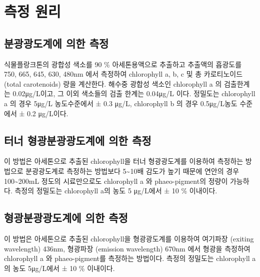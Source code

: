 \documentclass[
]{book}
\begin{document}
\hypertarget{uxce21uxc815-uxc6d0uxb9ac-4}{%
\section{측정 원리}\label{uxce21uxc815-uxc6d0uxb9ac-4}}

\hypertarget{uxbd84uxad11uxad11uxb3c4uxacc4uxc5d0-uxc758uxd55c-uxce21uxc815}{%
\subsection{분광광도계에 의한 측정}\label{uxbd84uxad11uxad11uxb3c4uxacc4uxc5d0-uxc758uxd55c-uxce21uxc815}}

식물플랑크톤의 광합성 색소를 90 \% 아세톤용액으로 추출하고 추출액의 흡광도를 750, 665, 645, 630, 480nm 에서 측정하여 chlorophyll a, b, c 및 총 카로티노이드 (total carotenoids) 량을 계산한다.
해수중 광합성 색소인 chlorophyll a 의 검출한계는 0.02μg/L이고, 그 이외 색소들의 검출 한계는 0.04μg/L 이다.
정밀도는 chlorophyll a 의 경우 5μg/L 농도수준에서 ± 0.3 μg/L, chlorophyll b 의 경우 0.5μg/L농도 수준에서 ± 0.2 μg/L이다.

\hypertarget{uxd130uxb108-uxd615uxad11uxbd84uxad11uxad11uxb3c4uxacc4uxc5d0-uxc758uxd55c-uxce21uxc815}{%
\subsection{터너 형광분광광도계에 의한 측정}\label{uxd130uxb108-uxd615uxad11uxbd84uxad11uxad11uxb3c4uxacc4uxc5d0-uxc758uxd55c-uxce21uxc815}}

이 방법은 아세톤으로 추출된 chlorophyll을 터너 형광광도계를 이용하여 측정하는 방법으로 분광광도계로 측정하는 방법보다 5\textasciitilde10배 감도가 높기 때문에 연안의 경우 100\textasciitilde200mL 정도의 시료만으로도 chlorophyll a 와 phaeo-pigment의 정량이 가능하다. 측정의 정밀도는 chlorophyll a의 농도 5 μg/L에서 ± 10 \% 이내이다.

\hypertarget{uxd615uxad11uxbd84uxad11uxad11uxb3c4uxacc4uxc5d0-uxc758uxd55c-uxce21uxc815}{%
\subsection{형광분광광도계에 의한 측정}\label{uxd615uxad11uxbd84uxad11uxad11uxb3c4uxacc4uxc5d0-uxc758uxd55c-uxce21uxc815}}

이 방법은 아세톤으로 추출된 chlorophyll을 형광광도계를 이용하여 여기파장 (exiting wavelength) 436nm, 형광파장 (emission wavelength) 670nm 에서 형광을 측정하여 chlorophyll a 와 phaeo-pigment를 측정하는 방법이다. 측정의 정밀도는 chlorophyll a 의 농도 5μg/L에서 ± 10 \% 이내이다.
\end{document}

